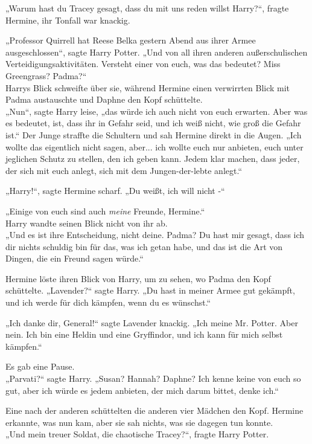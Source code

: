 {„Warum hast du Tracey gesagt, dass du mit uns reden willst Harry?“, fragte Hermine, ihr Tonfall war knackig.

„Professor Quirrell hat Reese Belka gestern Abend aus ihrer Armee ausgeschlossen“, sagte Harry Potter. „Und von all ihren anderen außerschulischen Verteidigungsaktivitäten. Versteht einer von euch, was das bedeutet? Miss Greengrass? Padma?“\\ Harrys Blick schweifte über sie, während Hermine einen verwirrten Blick mit Padma austauschte und Daphne den Kopf schüttelte.\\ „Nun“, sagte Harry leise, „das würde ich auch nicht von euch erwarten. Aber was es bedeutet, ist, dass ihr in Gefahr seid, und ich weiß nicht, wie groß die Gefahr ist.“ Der Junge straffte die Schultern und sah Hermine direkt in die Augen. „Ich wollte das eigentlich nicht sagen, aber... ich wollte euch nur anbieten, euch unter jeglichen Schutz zu stellen, den ich geben kann. Jedem klar machen, dass jeder, der sich mit euch anlegt, sich mit dem Jungen-der-lebte anlegt.“

„Harry!“, sagte Hermine scharf. „Du weißt, ich will nicht -“

„Einige von euch sind auch \emph{meine} Freunde, Hermine.“\\ Harry wandte seinen Blick nicht von ihr ab.\\ „Und es ist ihre Entscheidung, nicht deine. Padma? Du hast mir gesagt, dass ich dir nichts schuldig bin für das, was ich getan habe, und das ist die Art von Dingen, die ein Freund sagen würde.“

Hermine löste ihren Blick von Harry, um zu sehen, wo Padma den Kopf schüttelte. „Lavender?“ sagte Harry. „Du hast in meiner Armee gut gekämpft, und ich werde für dich kämpfen, wenn du es wünschst.“

„Ich danke dir, General!“ sagte Lavender knackig. „Ich meine Mr. Potter. Aber nein. Ich bin eine Heldin und eine Gryffindor, und ich kann für mich selbst kämpfen.“

Es gab eine Pause.\\ „Parvati?“ sagte Harry. „Susan? Hannah? Daphne? Ich kenne keine von euch so gut, aber ich würde es jedem anbieten, der mich darum bittet, denke ich.“

Eine nach der anderen schüttelten die anderen vier Mädchen den Kopf. Hermine erkannte, was nun kam, aber sie sah nichts, was sie dagegen tun konnte.\\ „Und mein treuer Soldat, die chaotische Tracey?“, fragte Harry Potter.

}
